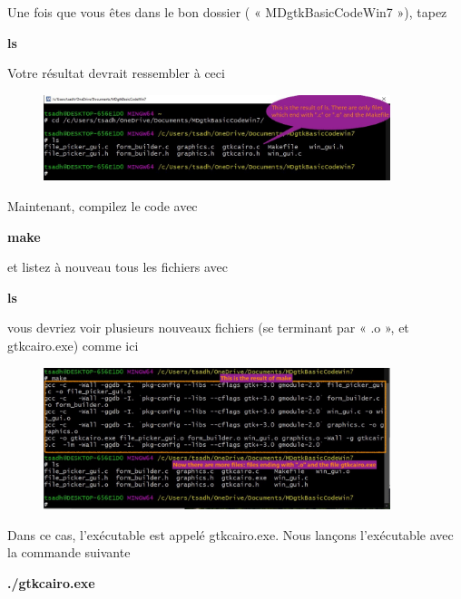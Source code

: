 \documentclass{article}
\begin{document}
Une fois que vous êtes dans le bon dossier ( « MDgtkBasicCodeWin7 »), tapez
\begin{tcolorbox}[width=\textwidth,colframe=MidnightBlue,colback={black},title={Ceci est la console MinGW-w64 Win64 Shell},outer arc=0mm,colupper=white]    
    \large\textbf{  ls }
\end{tcolorbox}
Votre résultat devrait ressembler à ceci
\begin{figure}[H]
\center
\includegraphics[width=0.9\textwidth]{Plots/MD_2CD.jpeg}
\end{figure}
Maintenant, compilez le code avec
\begin{tcolorbox}[width=\textwidth,colframe=MidnightBlue,colback={black},title={Ceci est la console MinGW-w64 Win64 Shell},outer arc=0mm,colupper=white]    
    \large\textbf{  make }
\end{tcolorbox}
et listez à nouveau tous les fichiers avec
\begin{tcolorbox}[width=\textwidth,colframe=MidnightBlue,colback={black},title={Ceci est la console MinGW-w64 Win64 Shell},outer arc=0mm,colupper=white]    
    \large\textbf{  ls }
\end{tcolorbox}
vous devriez voir plusieurs nouveaux fichiers (se terminant par « .o », et gtkcairo.exe) comme ici
\begin{figure}[H]
\center
\includegraphics[width=0.9\textwidth]{Plots/MD_3Make.jpeg}
\end{figure}
Dans ce cas, l'exécutable est appelé gtkcairo.exe. Nous lançons l'exécutable avec la commande suivante
\begin{tcolorbox}[width=\textwidth,colframe=MidnightBlue,colback={black},title={Ceci est la console MinGW-w64 Win64 Shell},outer arc=0mm,colupper=white]    
    \large\textbf{  ./gtkcairo.exe }
\end{tcolorbox}
\end{document}
